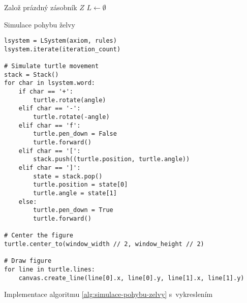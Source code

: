 \begin{algorithm}[H]
    Založ prázdný zásobník $Z$\;
    $L\gets\emptyset$\;
    \;
    \caption{Simulace pohybu želvy}
    \label{alg:simulace-pohybu-zelvy}
\end{algorithm}
\begin{program}[h]
\begin{lstlisting}[style=python]
lsystem = LSystem(axiom, rules)
lsystem.iterate(iteration_count)

# Simulate turtle movement
stack = Stack()
for char in lsystem.word:
    if char == '+':
        turtle.rotate(angle)
    elif char == '-':
        turtle.rotate(-angle)
    elif char == 'f':
        turtle.pen_down = False
        turtle.forward()
    elif char == '[':
        stack.push((turtle.position, turtle.angle))
    elif char == ']':
        state = stack.pop()
        turtle.position = state[0]
        turtle.angle = state[1]
    else:
        turtle.pen_down = True
        turtle.forward()

# Center the figure        
turtle.center_to(window_width // 2, window_height // 2)

# Draw figure
for line in turtle.lines:
    canvas.create_line(line[0].x, line[0].y, line[1].x, line[1].y)
\end{lstlisting}
    \caption{Implementace algoritmu \ref{alg:simulace-pohybu-zelvy} s~vykreslením}
    \label{prog:simulace-pohybu-zelvy-a-vykresleni}
\end{program}